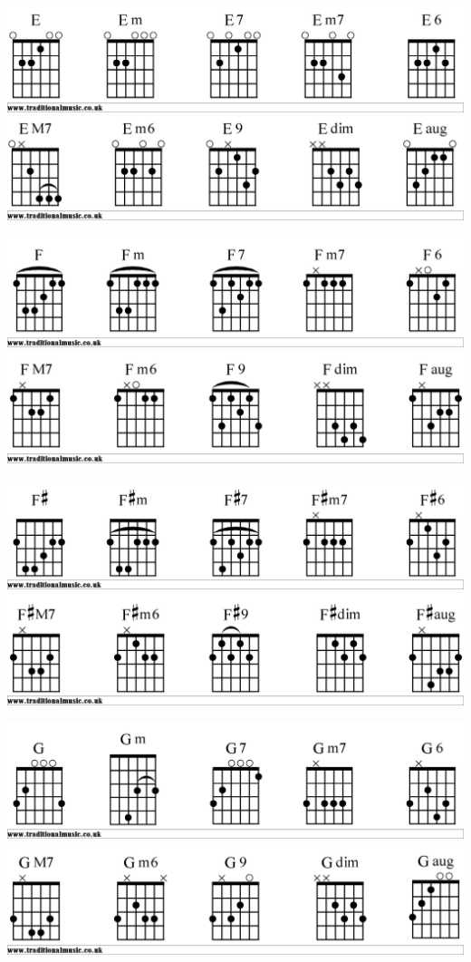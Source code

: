 \includegraphics[scale=.15]{Egtr1}
\includegraphics[scale=.15]{Egtr2}

\includegraphics[scale=.15]{Fgtr1}
\includegraphics[scale=.15]{Fgtr2}

\includegraphics[scale=.15]{Fsgtr1}
\includegraphics[scale=.15]{Fsgtr2}

\includegraphics[scale=.15]{Ggtr1}
\includegraphics[scale=.15]{Ggtr2}

